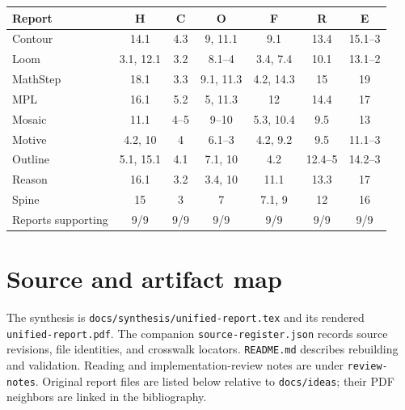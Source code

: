 \documentclass[11pt,letterpaper]{article}
\newcommand{\code}[1]{\nolinkurl{#1}}
\begin{document}
\begin{center}\small
\begin{tabular}{@{}lcccccc@{}}
\toprule
Report & H & C & O & F & R & E \\
\midrule
Contour & 14.1 & 4.3 & 9, 11.1 & 9.1 & 13.4 & 15.1--3\\
Loom & 3.1, 12.1 & 3.2 & 8.1--4 & 3.4, 7.4 & 10.1 & 13.1--2\\
MathStep & 18.1 & 3.3 & 9.1, 11.3 & 4.2, 14.3 & 15 & 19\\
MPL & 16.1 & 5.2 & 5, 11.3 & 12 & 14.4 & 17\\
Mosaic & 11.1 & 4--5 & 9--10 & 5.3, 10.4 & 9.5 & 13\\
Motive & 4.2, 10 & 4 & 6.1--3 & 4.2, 9.2 & 9.5 & 11.1--3\\
Outline & 5.1, 15.1 & 4.1 & 7.1, 10 & 4.2 & 12.4--5 & 14.2--3\\
Reason & 16.1 & 3.2 & 3.4, 10 & 11.1 & 13.3 & 17\\
Spine & 15 & 3 & 7 & 7.1, 9 & 12 & 16\\
\midrule
Reports supporting & 9/9 & 9/9 & 9/9 & 9/9 & 9/9 & 9/9\\
\bottomrule
\end{tabular}
\end{center}

\section{Source and artifact map}\label{app:sources}
The synthesis is \code{docs/synthesis/unified-report.tex} and its rendered
\code{unified-report.pdf}. The companion \code{source-register.json} records source
revisions, file identities, and crosswalk locators. \code{README.md} describes
rebuilding and validation. Reading and implementation-review notes are under
\code{review-notes}. Original report files are listed below relative to
\code{docs/ideas}; their PDF neighbors are linked in the bibliography.

\begin{flushleft}\small\ttfamily
{}\\
\\
\\
\\
\\
\\
\\
\\
\end{flushleft}
\end{document}
